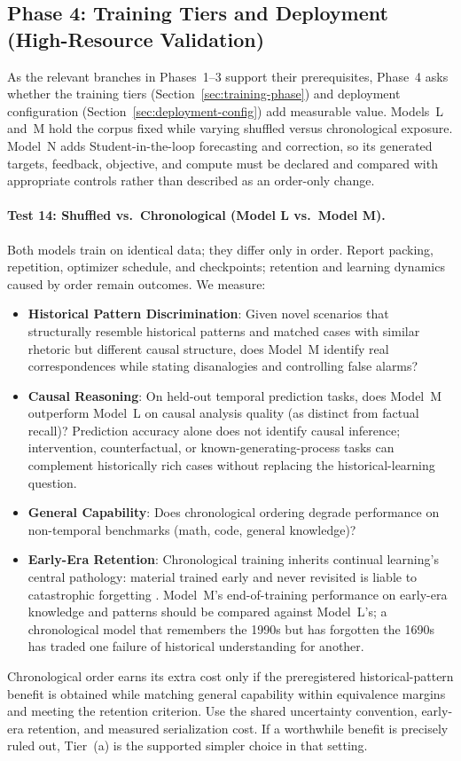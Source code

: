 \documentclass[11pt]{article}
\begin{document}
\subsection{Phase 4: Training Tiers and Deployment (High-Resource Validation)}\label{sec:phase4}

As the relevant branches in Phases~1--3 support their prerequisites, Phase~4
asks whether the training tiers (Section~\ref{sec:training-phase}) and
deployment configuration (Section~\ref{sec:deployment-config}) add measurable
value. Models~L and~M hold the corpus fixed while varying shuffled
versus chronological exposure. Model~N adds Student-in-the-loop forecasting
and correction, so its generated targets, feedback, objective, and compute must
be declared and compared with appropriate controls rather than described as an
order-only change.

\paragraph{Test 14: Shuffled vs.\ Chronological (Model L vs.\ Model M).}
Both models train on identical data; they differ only in order. Report packing, repetition, optimizer schedule, and checkpoints; retention
and learning dynamics caused by order remain outcomes. We measure:
\begin{itemize}
    \item \textbf{Historical Pattern Discrimination}: Given novel scenarios
    that structurally resemble historical patterns and matched cases with
    similar rhetoric but different causal structure, does Model~M identify real
    correspondences while stating disanalogies and controlling false alarms?
    \item \textbf{Causal Reasoning}: On held-out temporal prediction tasks, does Model~M outperform Model~L on causal analysis quality (as distinct from factual recall)? Prediction accuracy alone does not identify causal inference; intervention, counterfactual, or known-generating-process tasks can complement historically rich cases without replacing the historical-learning question.
    \item \textbf{General Capability}: Does chronological ordering degrade performance on non-temporal benchmarks (math, code, general knowledge)?
    \item \textbf{Early-Era Retention}: Chronological training inherits continual learning's central pathology: material trained early and never revisited is liable to catastrophic forgetting \cite{vandeven2024continuallearningcatastrophicforgetting}. Model~M's end-of-training performance on early-era knowledge and patterns should be compared against Model~L's; a chronological model that remembers the 1990s but has forgotten the 1690s has traded one failure of historical understanding for another.
\end{itemize}
Chronological order earns its extra cost only if the preregistered historical-pattern benefit is obtained while matching general capability within equivalence margins and meeting the retention criterion. Use the shared uncertainty convention, early-era retention, and measured serialization cost. If a worthwhile benefit is precisely ruled out, Tier~(a) is the supported simpler choice in that setting.
\end{document}
